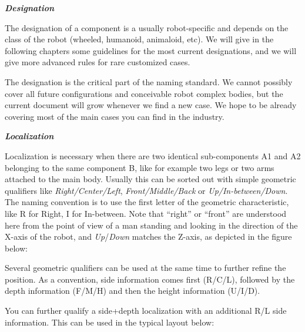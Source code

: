 \documentclass[a4paper]{article}
\begin{document}
{\sffamily\bfseries\itshape
Designation}

{\sffamily
The designation of a component is a usually robot-specific and depends
on the class of the robot (wheeled, humanoid, animaloid, etc). We will
give in the following chapters some guidelines for the most current
designations, and we will give more advanced rules for rare customized
cases. }

{\sffamily
The designation is the critical part of the naming standard. We cannot
possibly cover all future configurations and conceivable robot complex
bodies, but the current document will grow whenever we find a new case.
We hope to be already covering most of the main cases you can find in
the industry.}

{\sffamily\bfseries\itshape
Localization }

{
\textsf{Localization is necessary when there are two identical
sub-components A1 and A2 belonging to the same component B, like for
example two legs or two arms attached to the main body. Usually this
can be sorted out with simple geometric qualifiers like
}\textsf{\textit{Right/Center/Left}}\textsf{,
}\textsf{\textit{Front/Middle/Back}}\textsf{ or
}\textsf{\textit{Up}}\textsf{\textit{/In-between/Down}}\textsf{. The
naming convention is to use the first letter of the geometric
characteristic, like }R\textsf{ for Right, }I\textsf{ for In-between.
Note that “right” or “front” are understood here from the point of view
of a man standing and looking in the direction of the X-axis of the
robot, and
}\textsf{\textit{Up}}\textsf{/}\textsf{\textit{Down}}\textsf{ matches
the Z-axis, as depicted in the figure below:}}

{\par}

{
\textsf{Several geometric qualifiers can be used at the same time to
further refine the position. As a convention, side information comes
first (}R\textsf{/}C\textsf{/}L\textsf{), followed by the depth
information (}F\textsf{/}M\textsf{/}H\textsf{) and then the height
information (}U\textsf{/}I\textsf{/}D\textsf{). }}

{\sffamily
You can further qualify a side+depth localization with an additional R/L
side information. This can be used in the typical layout below:}

{\centering
\par}
\end{document}
